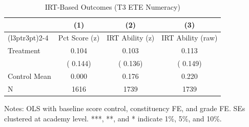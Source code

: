 \begin{table}[!htbp]
\centering
\caption{IRT-Based Outcomes (T3 ETE Numeracy)}
\label{tab:ng_irt}
\begin{threeparttable}
\begin{tabular}[t]{lccc}
\toprule
 & (1) & (2) & (3) \\
\cmidrule(l{3pt}r{3pt}){2-4}
 & Pct Score (z) & IRT Ability (z) & IRT Ability (raw) \\
\midrule
Treatment &   0.104 &   0.103 &   0.113 \\
 & (  0.144) & (  0.136) & (  0.149) \\
\addlinespace
Control Mean &   0.000 &   0.176 &   0.220 \\
N & 1616 & 1739 & 1739 \\
\bottomrule
\end{tabular}
\begin{tablenotes}[para]
\item Notes: OLS with baseline score control, constituency FE, and grade FE. 
SEs clustered at academy level. ***, **, and * indicate 1\%, 5\%, and 10\%.
\end{tablenotes}
\end{threeparttable}
\end{table}

